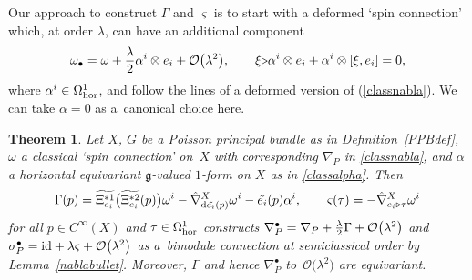 \documentclass[pdftex]{sigma}
\numberwithin{equation}{section}
\newtheorem{Theorem}{Theorem}[section]
\newcommand{\<}{{\langle}}
\renewcommand{\>}{{\rangle}}
\newcommand{\tens}{\otimes}
\newcommand{\id}{{\rm id}}
\newcommand{\extd}{{\rm d}}
\newcommand{\la}{{\triangleright}}
\newcommand{\cg}{{\mathfrak{g}}}
\begin{document}
Our approach to construct $\Gamma$ and $\varsigma$ is to start with a deformed `spin connection' which, at order $\lambda$, can have an additional component
 \begin{equation}\label{classalpha} \omega_\bullet=\omega+ {\lambda\over 2}\alpha^i\tens e_i+ \mathcal{O}\big(\lambda^2\big),\qquad \xi\la\alpha^i\tens e_i+ \alpha^i\tens [\xi,e_i]=0,\end{equation}
where $\alpha^i\in \Omega^1_{\rm hor}$, and follow the lines of a deformed version of (\ref{classnabla}). We can take $\alpha=0$ as a~canonical choice here.

\begin{Theorem}\label{semiclassbundleconn} Let $X$, $G$ be a Poisson principal bundle as in Definition~{\rm \ref{PPBdef}}, $\omega$ a classical `spin connection' on~$X$ with corresponding $\nabla_P$ in \eqref{classnabla}, and $\alpha$ a horizontal equivariant $\cg$-valued $1$-form on $X$ as in \eqref{classalpha}. Then
\begin{equation}\label{Gammaomega}\Gamma(p)=\widetilde{\Xi_{e_i}^{*1}}\big(\widetilde{\Xi_{e_i}^{*2}}(p)\big)\omega^i- \hat\nabla^X_{\extd \tilde{e_i}(p)}\omega^i-\tilde{e_i}(p)\alpha^i,\qquad \varsigma(\tau)=- \hat\nabla^X_{e_i\la\tau}\omega^i\end{equation}
for all $p\in C^\infty(X)$ and $\tau\in \Omega^1_{\rm hor}$ constructs $\nabla^\bullet_{P} =\nabla_P +{\lambda\over 2}\Gamma+ \mathcal{O}\big(\lambda^2\big)$ and $\sigma^\bullet_P=\id+\lambda\varsigma+\mathcal{O}\big(\lambda^2\big)$ as a~bimodule connection at semiclassical order by Lemma~{\rm \ref{nablabullet}}. Moreover, $\Gamma$ and hence $\nabla^\bullet_P$ to~$\mathcal{O}\big(\lambda^2\big)$ are equivariant.
\end{Theorem}
\end{document}
